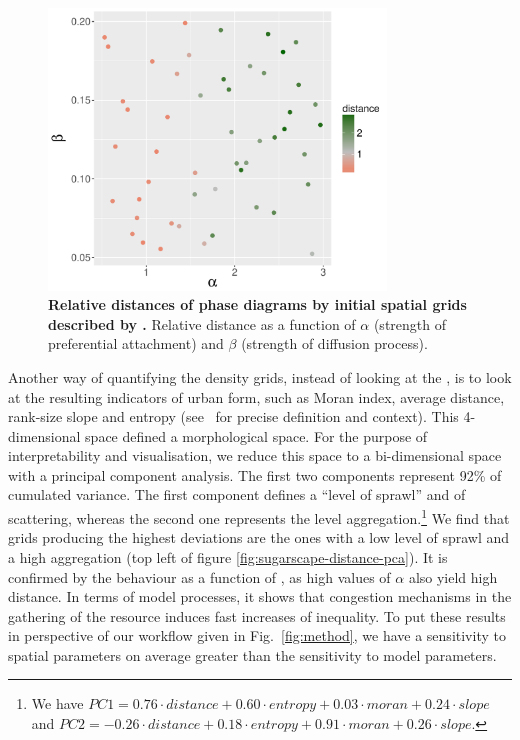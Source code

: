 \documentclass[preprint,5p,times,twocolumn,authoryear]{elsarticle}
\begin{document}
\begin{figure}
\centering
\includegraphics[width=0.8\textwidth]{figures/relativedistance_metaparams}
\caption{\textbf{Relative distances of phase diagrams by initial spatial grids described by .} Relative distance as a function of  $\alpha$ (strength of preferential attachment) and $\beta$ (strength of diffusion process).}
\label{fig:sugarscape-distance-meta}
\end{figure}

Another way of quantifying the density grids, instead of looking at the , is to look at the resulting indicators of urban form, such as Moran index, average distance, rank-size slope and entropy (see~\cite{LeNechet2015} for precise definition and context). This 4-dimensional space defined a morphological space. For the purpose of interpretability and visualisation, we reduce this space to a bi-dimensional space with a principal component analysis. The first two components represent 92\% of cumulated variance. The first component defines a ``level of sprawl'' and of scattering, whereas the second one represents the level aggregation.\footnote{We have $PC1 = 0.76\cdot distance + 0.60\cdot entropy + 0.03\cdot moran + 0.24\cdot slope$ and $PC2 = -0.26\cdot distance + 0.18\cdot entropy + 0.91\cdot moran + 0.26\cdot slope$.} We find that grids producing the highest deviations are the ones with a low level of sprawl and a high aggregation (top left of figure \ref{fig:sugarscape-distance-pca}). It is confirmed by the behaviour as a function of , as high values of $\alpha$ also yield high distance. In terms of model processes, it shows that congestion mechanisms in the gathering of the resource induces fast increases of inequality. To put these results in perspective of our workflow given in Fig.~\ref{fig:method}, we have a sensitivity to spatial parameters on average greater than the sensitivity to model parameters.
\end{document}
